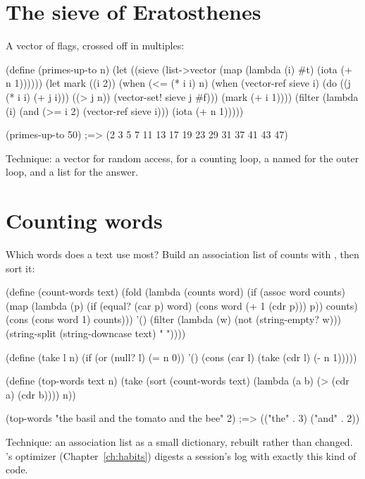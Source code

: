 \section{The sieve of Eratosthenes}

A vector of flags, crossed off in multiples:

\begin{scm}
(define (primes-up-to n)
  (let ((sieve (list->vector (map (lambda (i) #t) (iota (+ n 1))))))
    (let mark ((i 2))
      (when (<= (* i i) n)
        (when (vector-ref sieve i)
          (do ((j (* i i) (+ j i))) ((> j n))
            (vector-set! sieve j #f)))
        (mark (+ i 1))))
    (filter (lambda (i) (and (>= i 2) (vector-ref sieve i)))
            (iota (+ n 1)))))

(primes-up-to 50)
;=> (2 3 5 7 11 13 17 19 23 29 31 37 41 43 47)
\end{scm}

Technique: a vector for random access,  for a counting loop, a
named  for the outer loop, and a list for the answer.

\section{Counting words}

Which words does a text use most? Build an association list of counts with
, then sort it:

\begin{scm}
(define (count-words text)
  (fold (lambda (counts word)
          (if (assoc word counts)
              (map (lambda (p)
                     (if (equal? (car p) word) (cons word (+ 1 (cdr p))) p))
                   counts)
              (cons (cons word 1) counts)))
        '()
        (filter (lambda (w) (not (string-empty? w)))
                (string-split (string-downcase text) " "))))

(define (take l n)
  (if (or (null? l) (= n 0)) '() (cons (car l) (take (cdr l) (- n 1)))))

(define (top-words text n)
  (take (sort (count-words text) (lambda (a b) (> (cdr a) (cdr b)))) n))

(top-words "the basil and the tomato and the bee" 2)
;=> (("the" . 3) ("and" . 2))
\end{scm}

Technique: an association list as a small dictionary, rebuilt rather than
changed. \nodwyn's optimizer (Chapter~\ref{ch:habits}) digests a session's
log with exactly this kind of code.

